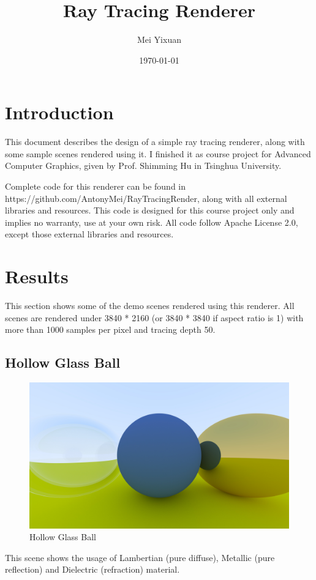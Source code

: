 \documentclass[utf8]{article}
\title{\bf\huge Ray Tracing Renderer}
\author{Mei Yixuan}
\date{\today}
\begin{document}
\maketitle

\section{Introduction}
This document describes the design of a simple ray tracing renderer, along with some sample scenes rendered using it. I finished it as course project for Advanced Computer Graphics, given by Prof. Shimming Hu in Tsinghua University.

Complete code for this renderer can be found in https://github.com/AntonyMei/RayTracingRender, along with all external libraries and resources. This code is designed for this course project only and implies no warranty, use at your own risk. All code follow Apache License 2.0, except those external libraries and resources.

\section{Results}
This section shows some of the demo scenes rendered using this renderer. All scenes are rendered under 3840 * 2160 (or 3840 * 3840 if aspect ratio is 1) with more than 1000 samples per pixel and tracing depth 50.

\subsection{Hollow Glass Ball}
\begin{figure}[H]
	\centering
	\includegraphics[width=0.7\linewidth]{../results/hollow_glass_ball}
	\caption{Hollow Glass Ball}
	\label{fig:hollowglassball}
\end{figure}
This scene shows the usage of Lambertian (pure diffuse), Metallic (pure reflection) and Dielectric (refraction) material.
\end{document}
